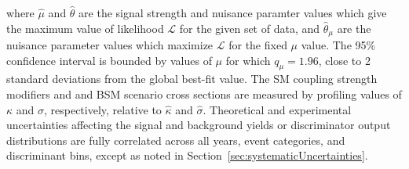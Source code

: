 where $\hat{\mu}$ and $\hat{\theta}$ are the signal strength and nuisance
paramter values which give the maximum value of likelihood $\mathcal{L}$
for the given set of data, and $\hat{\theta}_{\mu}$ are the nuisance
parameter values which maximize $\mathcal{L}$ for the fixed $\mu$ value.
The 95\% confidence interval is bounded by values of $\mu$ for which
$q_{\mu} = 1.96$, close to 2 standard deviations from the global best-fit value.
The SM coupling strength modifiers and and BSM scenario cross sections
are measured by profiling values of $\kappa$ and $\sigma$, respectively,
relative to $\hat{\kappa}$ and $\hat{\sigma}$.
Theoretical and experimental uncertainties affecting the signal and
background yields or discriminator output distributions are fully
correlated across all years, event categories, and discriminant bins,
except as noted in Section~\ref{sec:systematicUncertainties}.


